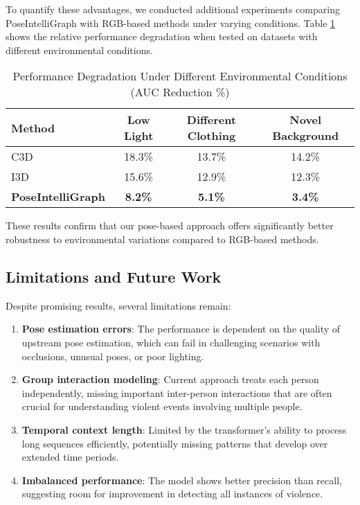 \documentclass[conference]{IEEEtran}
\begin{document}
To quantify these advantages, we conducted additional experiments comparing
PoseIntelliGraph with RGB-based methods under varying conditions. Table
\ref{tab:robustness} shows the relative performance degradation when tested on
datasets with different environmental conditions.

\begin{table}[htbp]
    \caption{Performance Degradation Under Different Environmental Conditions (AUC Reduction \%)}
    \begin{center}
        \renewcommand{\arraystretch}{1.2}
        \begin{tabular}{|l|c|c|c|}
            \hline
            \rowcolor[gray]{0.9}
            \textbf{Method}            & \textbf{Low Light} & \textbf{Different Clothing} & \textbf{Novel Background} \\
            \hline
            C3D \cite{wu2020not}       & 18.3\%             & 13.7\%                      & 14.2\%                    \\
            \hline
            I3D \cite{carreira2017quo} & 15.6\%             & 12.9\%                      & 12.3\%                    \\
            \hline
            \textbf{PoseIntelliGraph}  & \textbf{8.2\%}     & \textbf{5.1\%}              & \textbf{3.4\%}            \\
            \hline
        \end{tabular}
    \end{center}
    \label{tab:robustness}
\end{table}

These results confirm that our pose-based approach offers significantly better
robustness to environmental variations compared to RGB-based methods.

\subsection{Limitations and Future Work}
Despite promising results, several limitations remain:

\begin{enumerate}
    \item \textbf{Pose estimation errors}: The performance is dependent on the quality of upstream pose estimation, which can fail in challenging scenarios with occlusions, unusual poses, or poor lighting.

    \item \textbf{Group interaction modeling}: Current approach treats each person independently, missing important inter-person interactions that are often crucial for understanding violent events involving multiple people.

    \item \textbf{Temporal context length}: Limited by the transformer's ability to process long sequences efficiently, potentially missing patterns that develop over extended time periods.

    \item \textbf{Imbalanced performance}: The model shows better precision than recall, suggesting room for improvement in detecting all instances of violence.
\end{enumerate}
\end{document}
